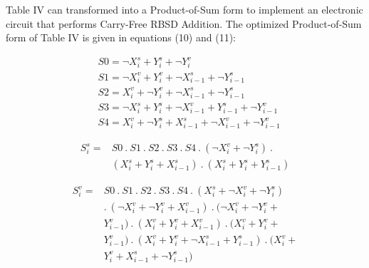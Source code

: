 \documentclass[conference]{IEEEtran_NCC}
\begin{document}
Table IV can transformed into a Product-of-Sum form to implement an electronic circuit that performs Carry-Free RBSD Addition. The optimized Product-of-Sum form of Table IV is given in equations (10) and (11):

\vspace{-1em}
\begin{align}
&S0 = \neg X_{i}^{s} + Y_{i}^{s} + \neg Y_{i}^{v}\\
&S1 = \neg X_{i}^{v} + Y_{i}^{v} + \neg X_{i-1}^{s} + \neg Y_{i-1}^{s}\\
&S2 = X_{i}^{v} + \neg Y_{i}^{v} + \neg X_{i-1}^{s} + \neg Y_{i-1}^{s}\\
&S3 = \neg X_{i}^{s} + Y_{i}^{s} + \neg X_{i-1}^{v} + Y_{i-1}^{s} + \neg Y_{i-1}^{v}\\
&S4 = X_{i}^{v} + \neg Y_{i}^{s} + X_{i-1}^{s} + \neg X_{i-1}^{v} + \neg Y_{i-1}^{v}
\end{align}

\vspace{-1em}
\begin{equation}
\begin{aligned}
S_{i}^s ={} &S0 \ . \ S1 \ . \ S2 \ . \ S3 \ . \ S4 \ . \ (\neg X_{i}^{v} + \neg Y_{i}^{s}) \ . \ \\
&(X_{i}^{s} + Y_{i}^{s} + X_{i-1}^{s}) \ . \ (X_{i}^{s} + Y_{i}^{s} + Y_{i-1}^{s})
\end{aligned}
\end{equation}

\vspace{-1em}
\begin{equation}
\begin{aligned}
S_{i}^v ={} &S0 \ . \ S1 \ . \ S2 \ . \ S3 \ . \ S4 \ . \ (X_{i}^{s} + \neg X_{i}^{v} + \neg Y_{i}^{s}) \ \\
&. \ (\neg X_{i}^{v} + \neg Y_{i}^{v} + X_{i-1}^{v}) \ . \ (\neg X_{i}^{v} + \neg Y_{i}^{v} + \\
&Y_{i-1}^{v}) \ . \ (X_{i}^{v} + Y_{i}^{v} + X_{i-1}^{v}) \ . \ (X_{i}^{v} + Y_{i}^{v} + \\
&Y_{i-1}^{v}) \ . \ (X_{i}^{v} + Y_{i}^{v} + \neg X_{i-1}^{s} + Y_{i-1}^{s}) \ . \ (X_{i}^{v} + \\
&Y_{i}^{v} + X_{i-1}^{s} + \neg Y_{i-1}^{s})
\end{aligned}
\end{equation}
\end{document}
